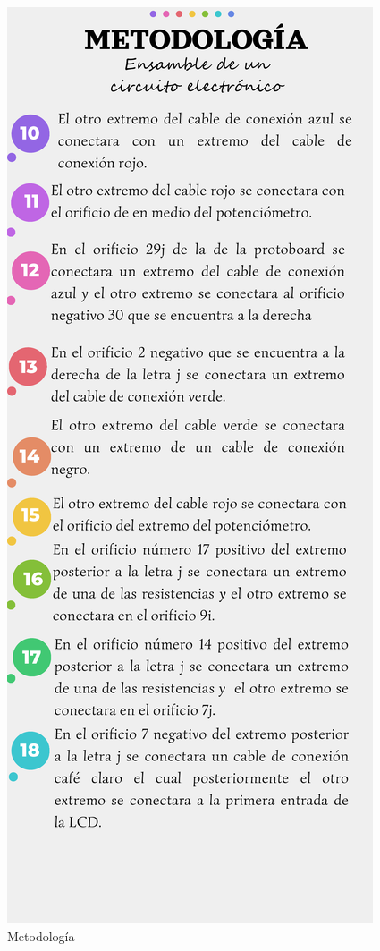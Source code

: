     \begin{figure}[H]
        \centering
        \includegraphics[trim = {5mm 10mm 5mm 50mm},clip,scale=0.4]{16/Img/instructivoCE(2).pdf}
        \caption{Metodología}
        \label{fig:InstructivoCE2}
    \end{figure}
